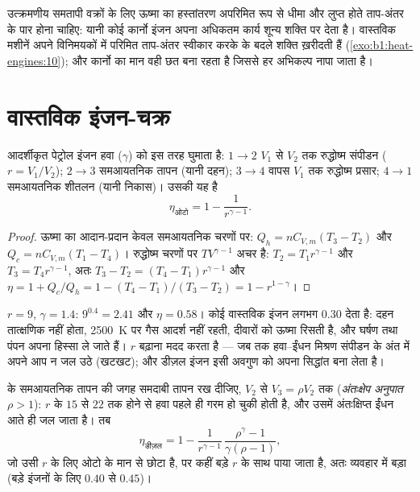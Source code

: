 \begin{remark}[कार्नो का चक्र एक प्रमेय है, कोई इंजन नहीं]\label{rem:b1:heat-engines:notengine}
उत्क्रमणीय समतापी वक्रों के लिए ऊष्मा का हस्तांतरण अपरिमित रूप से धीमा और
लुप्त होते ताप-अंतर के पार होना चाहिए: यानी कोई कार्नो इंजन अपना अधिकतम
कार्य शून्य शक्ति पर देता है। वास्तविक मशीनें अपने विनिमयकों में परिमित
ताप-अंतर स्वीकार करके  के बदले शक्ति ख़रीदती हैं
(\cref{exo:b1:heat-engines:10}); और कार्नो का मान वही छत बना रहता है जिससे
हर अभिकल्प नापा जाता है।
\end{remark}

\section{वास्तविक इंजन-चक्र}

\begin{proposition}[ओटो चक्र]\label{prop:b1:heat-engines:otto}
आदर्शीकृत पेट्रोल इंजन हवा ($\gamma$) को इस तरह घुमाता है: $1 \to 2$
$V_1$ से $V_2$ तक रुद्धोष्म संपीडन (\emph{}
$r = V_1/V_2$); $2 \to 3$ समआयतनिक तापन (यानी दहन); $3 \to 4$
वापस $V_1$ तक रुद्धोष्म प्रसार; $4 \to 1$ समआयतनिक शीतलन (यानी
निकास)। उसकी  यह है
\[
\eta_{\text{ओटो}} = 1 - \frac{1}{r^{\gamma-1}} .
\]
\end{proposition}

\begin{proof}
ऊष्मा का आदान-प्रदान केवल समआयतनिक चरणों पर:
$Q_h = nC_{V,m}(T_3 - T_2)$ और $Q_c = nC_{V,m}(T_1 - T_4)$। रुद्धोष्म चरणों पर $TV^{\gamma-1}$ अचर है:
$T_2 = T_1r^{\gamma-1}$ और $T_3 = T_4r^{\gamma-1}$, अतः $T_3 - T_2 =
(T_4 - T_1)r^{\gamma-1}$ और
$\eta = 1 + Q_c/Q_h = 1 - (T_4 - T_1)/(T_3 - T_2) = 1 - r^{1-\gamma}$।
\end{proof}

\begin{example}[किसी पेट्रोल इंजन के आँकड़े]\label{ex:b1:heat-engines:ottonumbers}
$r = 9$, $\gamma = 1.4$: $9^{0.4} = 2.41$ और $\eta = 0.58$। कोई वास्तविक
इंजन लगभग $0.30$ देता है: दहन तात्क्षणिक नहीं होता, \qty{2500}{K} पर गैस
आदर्श नहीं रहती, दीवारों को ऊष्मा रिसती है, और घर्षण तथा पंपन अपना हिस्सा
ले जाते हैं। $r$ बढ़ाना मदद करता है --- जब तक हवा--ईंधन मिश्रण संपीडन के अंत
में अपने आप न जल उठे (खटखट); और डीज़ल इंजन इसी अवगुण को अपना सिद्धांत बना
लेता है।
\end{example}

\begin{proposition}[डीज़ल चक्र]\label{prop:b1:heat-engines:diesel}
 के समआयतनिक तापन की जगह समदाबी तापन रख दीजिए, $V_2$ से
$V_3 = \rho V_2$ तक (\emph{अंतःक्षेप अनुपात} $\rho > 1$):  $r$
के $15$ से $22$ तक होने से हवा पहले ही गरम हो चुकी होती है, और उसमें
अंतःक्षिप्त ईंधन आते ही जल जाता है। तब
\[
\eta_{\text{डीज़ल}} = 1 - \frac{1}{r^{\gamma-1}}\,\frac{\rho^{\gamma} - 1}{\gamma(\rho - 1)} ,
\]
जो उसी $r$ के लिए ओटो के मान से छोटा है, पर कहीं बड़े $r$ के साथ पाया जाता
है, अतः व्यवहार में बड़ा (बड़े इंजनों के लिए $0.40$ से $0.45$)।
\end{proposition}

